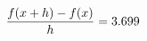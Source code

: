 \documentclass[preview]{standalone}
\begin{document}
\begin{align*}
\special{dvisvgm:raw <g id='unique000'>}\frac{f(x+h)-f(x)}{h} = 3.699\special{dvisvgm:raw </g>}
\end{align*}
\end{document}
